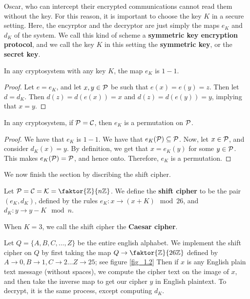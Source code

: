 Oscar, who can intercept their encrypted
communications cannot read them without the key. For this reason, it is
important to choose the key $K$ in a secure setting. Here, the encyrptor and the
decryptor are just simply the maps $e_K$ and  $d_K$ of the system. We call this
kind of scheme a \textbf{symmetric key encryption protocol}, and we call the key
$K$ in this setting the  \textbf{symmetric key}, or the \textbf{secret key}.

\begin{lemma}\label{1.1.1}
    In any cryptosystem with any key $K$, the map $e_K$ is $1-1$.
\end{lemma}
\begin{proof}
    Let  $e=e_K$, and let  $x,y \in \mathcal{P}$ be such that  $e(x)=e(y)=z$. Then let
    $d=d_K$. Then $d(z)=d(e(x))=x$ and $d(z)=d(e(y))=y$, implying that $x=y$.
\end{proof}

\begin{lemma}\label{1.1.2}
    In any cryptosystem, if $\mathcal{P}=\mathcal{C}$, then  $e_K$ is a permutation on $\mathcal{P}$.
\end{lemma}
\begin{proof}
    We have that $e_K$ is  $1-1$. We have that $e_K(\mathcal{P}) \subseteq \mathcal{P}$. Now,
    let $x \in \mathcal{P}$, and consider $d_K(x)=y$. By definition, we get that
    $x=e_K(y)$ for some $y \in \mathcal{P}$. This makes $e_K(\mathcal{P})=\mathcal{P}$, and hence onto.
    Therefore, $e_K$ is a permutation.
\end{proof}

We now finish the section by discribing the shift cipher.

\begin{definition}
    Let $\Pc=\Cc=\Kc=\faktor{\Z}{n\Z}$. We define the \textbf{shift cipher} to
    be the pair $(e_K, d_K)$, defined by the rules $e_K:x \rightarrow (x+K)
    \mod{26}$, and $d_K:y \rightarrow y-K \mod{n}$.
\end{definition}
\begin{remark}
    When $K=3$, we call the shift cipher the \textbf{Caesar cipher}.
\end{remark}

\begin{example}
    Let $Q=\{A,B,C, \dots, Z\}$ be the entire english alphabet. We implement the
    shift cipher on $Q$ by first taking the map  $Q \rightarrow \faktor{\Z}{26\Z}$
    defined by $A \rightarrow 0, B \rightarrow 1, C \rightarrow 2 \dots Z
    \rightarrow 25$; see figure \ref{fig_1.2} Then if $x$ is any English plain text
    message  (without spaces), we compute the cipher text on the image of $x$, and
    then take the inverse map to get our cipher  $y$ in English plaintext. To
    decrypt, it is the same process, except computing $d_K$.
\end{example}

